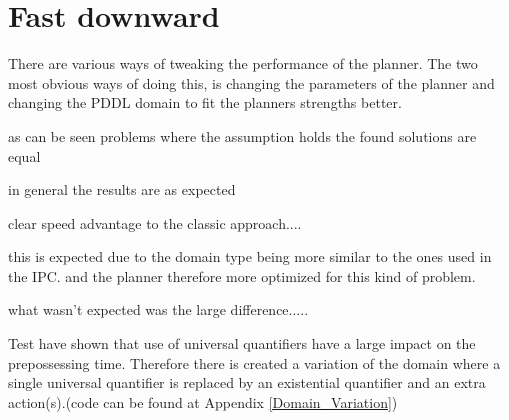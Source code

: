\section{Fast downward}



	There are various ways of tweaking the performance of the planner. The two most obvious ways of doing this, is changing the parameters of the planner and changing the PDDL domain to fit the planners strengths better.

	
		
			
			as can be seen problems where the assumption holds the found solutions are equal
			
			
			
			
			in general the results are as expected
			
			
			
		
		
			clear speed advantage to the classic approach....
			
			this is expected due to the domain type being more similar to the ones used in the IPC. and the planner therefore more optimized for this kind of problem.
			
			what wasn't expected was the large difference.....
			
			
			 Test have shown that use of universal quantifiers have a large impact on the prepossessing time. Therefore there is created a variation of the domain where a single universal quantifier is replaced by an existential quantifier and an extra action(s).(code can be found at Appendix \ref{Domain_Variation})



